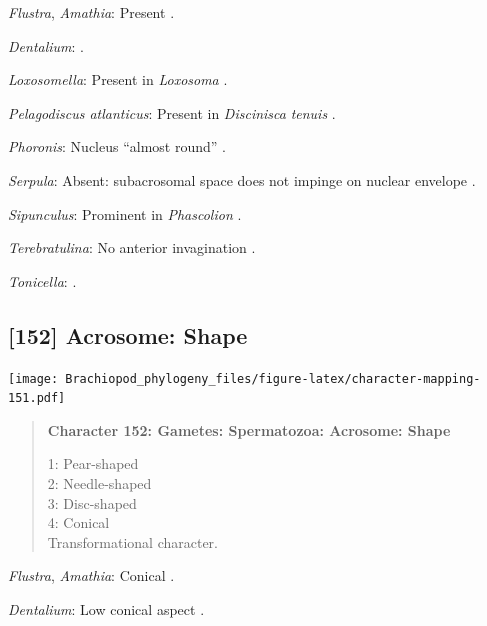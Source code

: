 \documentclass[openany]{book}
\begin{document}
\hypertarget{Amathia-coding-151}{}
\emph{Flustra}, \emph{Amathia}: Present \citep[in
\emph{Tubulipora};][]{Franzen1984}.

\hypertarget{Dentalium-coding-151}{}
\emph{Dentalium}: \citet{DufresneDube1983}.

\hypertarget{Loxosomella-coding-151}{}
\emph{Loxosomella}: Present in \emph{Loxosoma} \citep{Franzen2000}.

\hypertarget{Pelagodiscus_atlanticus-coding-151}{}
\emph{Pelagodiscus atlanticus}: Present in \emph{Discinisca}
\emph{tenuis} \citep{Hodgson1994Ultrastructureof}.

\hypertarget{Phoronis-coding-151}{}
\emph{Phoronis}: Nucleus ``almost round''
\citep{Reunov2004Ultrastructuralstudy}.

\hypertarget{Serpula-coding-151}{}
\emph{Serpula}: Absent: subacrosomal space does not impinge on nuclear
envelope \citep{Gherardi2011}.

\hypertarget{Sipunculus-coding-151}{}
\emph{Sipunculus}: Prominent in \emph{Phascolion} \citep{Rice1993}.

\hypertarget{Terebratulina-coding-151}{}
\emph{Terebratulina}: No anterior invagination
\citep{Hodgson1994Ultrastructureof}.

\hypertarget{Tonicella-coding-151}{}
\emph{Tonicella}: \citet{BucklandNicks1988}.

\subsection*{{[}152{]} Acrosome: Shape}\label{acrosome-shape}

\texttt{[image: Brachiopod\_phylogeny\_files/figure-latex/character-mapping-151.pdf]}

\begin{quote}
\textbf{Character 152: Gametes: Spermatozoa: Acrosome: Shape}

1: Pear-shaped\\
2: Needle-shaped\\
3: Disc-shaped\\
4: Conical\\
Transformational character.
\end{quote}

\hypertarget{Amathia-coding-152}{}
\emph{Flustra}, \emph{Amathia}: Conical \citep[in
\emph{Tubulipora};][]{Franzen1984}.

\hypertarget{Dentalium-coding-152}{}
\emph{Dentalium}: Low conical aspect \citep{DufresneDube1983}.
\end{document}
